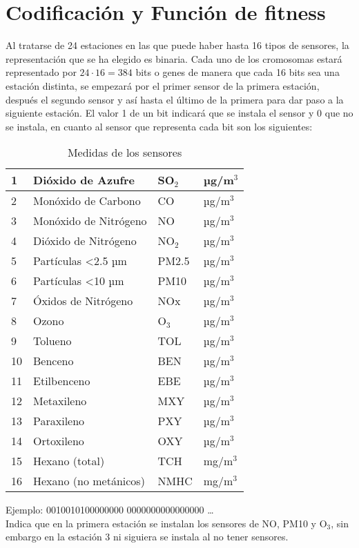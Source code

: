 \documentclass[12pt, spanish, pdftex]{UC3M_document}
\begin{document}
\section{Codificación y Función de fitness}
Al tratarse de 24 estaciones en las que puede haber hasta 16 tipos de sensores, la representación que se ha elegido es binaria. Cada uno de los cromosomas estará representado por $24 \cdot 16=384$ bits o genes de manera que cada 16 bits sea una estación distinta, se empezará por el primer sensor de la primera estación, después el segundo sensor y así hasta el último de la primera para dar paso a la siguiente estación. El valor 1 de un bit indicará que se instala el sensor y 0 que no se instala, en cuanto al sensor que representa cada bit son los siguientes:
\begin{table}[H]
  \centering
  \caption{Medidas de los sensores}
  \begin{tabular}{|l|l|l|l|}
    \hline
    1  & Dióxido de Azufre           & SO$_2$ & µg/m$^3$ \\ \hline
    2  & Monóxido de Carbono         & CO     & µg/m$^3$ \\ \hline
    3  & Monóxido de Nitrógeno       & NO     & µg/m$^3$ \\ \hline
    4  & Dióxido de Nitrógeno        & NO$_2$ & µg/m$^3$ \\ \hline
    5  & Partículas \textless 2.5 µm & PM2.5  & µg/m$^3$ \\ \hline
    6  & Partículas \textless 10 µm  & PM10   & µg/m$^3$ \\ \hline
    7  & Óxidos de Nitrógeno         & NOx    & µg/m$^3$ \\ \hline
    8  & Ozono                       & O$_3$  & µg/m$^3$ \\ \hline
    9  & Tolueno                     & TOL    & µg/m$^3$ \\ \hline
    10 & Benceno                     & BEN    & µg/m$^3$ \\ \hline
    11 & Etilbenceno                 & EBE    & µg/m$^3$ \\ \hline
    12 & Metaxileno                  & MXY    & µg/m$^3$ \\ \hline
    13 & Paraxileno                  & PXY    & µg/m$^3$ \\ \hline
    14 & Ortoxileno                  & OXY    & µg/m$^3$ \\ \hline
    15 & Hexano (total)              & TCH    & mg/m$^3$ \\ \hline
    16 & Hexano (no metánicos)       & NMHC   & mg/m$^3$ \\ \hline
  \end{tabular}
\end{table}
Ejemplo: 0010010100000000 0000000000000000 … \\ Indica que en la primera estación se instalan los sensores de NO, PM10 y O$_3$, sin embargo en la estación 3 ni siguiera se instala al no tener sensores.
\pagebreak
\end{document}
